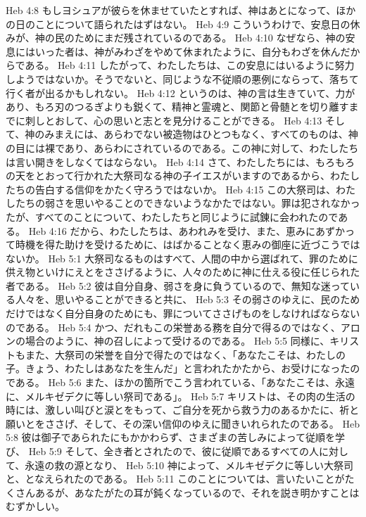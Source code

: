 Heb 4:8  もしヨシュアが彼らを休ませていたとすれば、神はあとになって、ほかの日のことについて語られたはずはない。
Heb 4:9  こういうわけで、安息日の休みが、神の民のためにまだ残されているのである。
Heb 4:10  なぜなら、神の安息にはいった者は、神がみわざをやめて休まれたように、自分もわざを休んだからである。
Heb 4:11  したがって、わたしたちは、この安息にはいるように努力しようではないか。そうでないと、同じような不従順の悪例にならって、落ちて行く者が出るかもしれない。
Heb 4:12  というのは、神の言は生きていて、力があり、もろ刃のつるぎよりも鋭くて、精神と霊魂と、関節と骨髄とを切り離すまでに刺しとおして、心の思いと志とを見分けることができる。
Heb 4:13  そして、神のみまえには、あらわでない被造物はひとつもなく、すべてのものは、神の目には裸であり、あらわにされているのである。この神に対して、わたしたちは言い開きをしなくてはならない。
Heb 4:14  さて、わたしたちには、もろもろの天をとおって行かれた大祭司なる神の子イエスがいますのであるから、わたしたちの告白する信仰をかたく守ろうではないか。
Heb 4:15  この大祭司は、わたしたちの弱さを思いやることのできないようなかたではない。罪は犯されなかったが、すべてのことについて、わたしたちと同じように試錬に会われたのである。
Heb 4:16  だから、わたしたちは、あわれみを受け、また、恵みにあずかって時機を得た助けを受けるために、はばかることなく恵みの御座に近づこうではないか。
Heb 5:1  大祭司なるものはすべて、人間の中から選ばれて、罪のために供え物といけにえとをささげるように、人々のために神に仕える役に任じられた者である。
Heb 5:2  彼は自分自身、弱さを身に負うているので、無知な迷っている人々を、思いやることができると共に、
Heb 5:3  その弱さのゆえに、民のためだけではなく自分自身のためにも、罪についてささげものをしなければならないのである。
Heb 5:4  かつ、だれもこの栄誉ある務を自分で得るのではなく、アロンの場合のように、神の召しによって受けるのである。
Heb 5:5  同様に、キリストもまた、大祭司の栄誉を自分で得たのではなく、「あなたこそは、わたしの子。きょう、わたしはあなたを生んだ」と言われたかたから、お受けになったのである。
Heb 5:6  また、ほかの箇所でこう言われている、「あなたこそは、永遠に、メルキゼデクに等しい祭司である」。
Heb 5:7  キリストは、その肉の生活の時には、激しい叫びと涙とをもって、ご自分を死から救う力のあるかたに、祈と願いとをささげ、そして、その深い信仰のゆえに聞きいれられたのである。
Heb 5:8  彼は御子であられたにもかかわらず、さまざまの苦しみによって従順を学び、
Heb 5:9  そして、全き者とされたので、彼に従順であるすべての人に対して、永遠の救の源となり、
Heb 5:10  神によって、メルキゼデクに等しい大祭司と、となえられたのである。
Heb 5:11  このことについては、言いたいことがたくさんあるが、あなたがたの耳が鈍くなっているので、それを説き明かすことはむずかしい。
